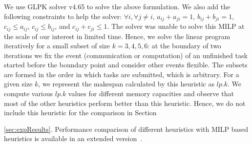 \documentclass[sigconf]{acmart}
\begin{document}
	
	We use GLPK solver v4.65 to solve the above formulation. We also add the following constraints to help the solver: $\forall i, \forall j\ne i$, $a_{ij} + a_{ji}=1$, $b_{ij} + b_{ji} = 1$, $c_{ij} \le a_{ij}$, $c_{ij} \le b_{ij}$, and  $c_{ij} + c_{ji} \le 1$. The solver was unable to  solve this MILP at the scale of our interest in limited time. Hence, we solve the linear program iteratively for a small subset of size $k=3, 4, 5, 6$: at the boundary of two iterations we fix the event (communication or computation) of an unfinished task started before the boundary point and consider other events flexible. The subsets are formed in the order in which tasks are submitted, which is arbitrary. For a given size $k$, we represent the makespan calculated by this heuristic as $lp.k$.
	We compute various $lp.k$ values for different memory capacities and observe that most of the other heuristics perform better than this heuristic. Hence, we do not include this heuristic for the comparison in Section~{\ref{sec:expResults}. Performance comparison of different heuristics with MILP based heuristics is available in an extended version~\cite{extendedVersion}.
		
		
}
\end{document}
